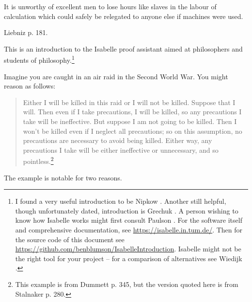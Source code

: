 %
\begin{isabellebody}%
%
%
\isadelimtheory
%
\endisadelimtheory
%
\isatagtheory
%
\endisatagtheory
{\isafoldtheory}%
%
\isadelimtheory
%
\endisadelimtheory
%
\begin{isamarkuptext}%
\epigraph{It is unworthy of excellent men to lose hours like slaves in the labour of calculation which could 
safely be relegated to anyone else if machines were used.}{Liebniz \cite{smith_source_1959} p. 181.}%
\end{isamarkuptext}\isamarkuptrue%
%
\begin{isamarkuptext}%
This is an introduction to the Isabelle proof assistant aimed at philosophers and students
of philosophy.\footnote{I found a very useful introduction to be Nipkow \cite{nipkow_tutorial_2011}.
Another still helpful, though unfortunately dated, introduction is Grechuk \cite{grechuk_isabelle_2010}.
A person wishing to know how Isabelle works might first consult Paulson \cite{paulson_ml_1996}.
For the software itself and comprehensive documentation, see \url{https://isabelle.in.tum.de/}.
Then for the source code of this document see \url{https://github.com/benblumson/IsabelleIntroduction}.
Isabelle might not be the right tool for your project -- for a comparison of alternatives see
Wiedijk \cite{wiedijk_seventeen_2006}.}%
\end{isamarkuptext}\isamarkuptrue%
%
\isadelimdocument
%
\endisadelimdocument
%
\isatagdocument
%
\isamarkuptrue%
%
\endisatagdocument
{\isafolddocument}%
%
\isadelimdocument
%
\endisadelimdocument
%
\begin{isamarkuptext}%
Imagine you are caught in an air raid in the Second World War. You might reason as follows:
\begin{quotation}
Either I will be killed in this raid or I will not be killed. Suppose that I will. Then even if I take
precautions, I will be killed, so any precautions I take will be ineffective. But suppose I am not
going to be killed. Then I won't be killed even if I neglect all precautions; so on this assumption,
no precautions are necessary to avoid being killed. Either way, any precautions I take will be either
ineffective or unnecessary, and so pointless.\footnote{This example is from Dummett \cite{dummett_bringing_1964} p. 345,
but the version quoted here is from Stalnaker \cite{stalnaker_indicative_1975} p. 280.}
\end{quotation} The example is notable for two reasons.%

\end{isamarkuptext}
\end{isabellebody}
